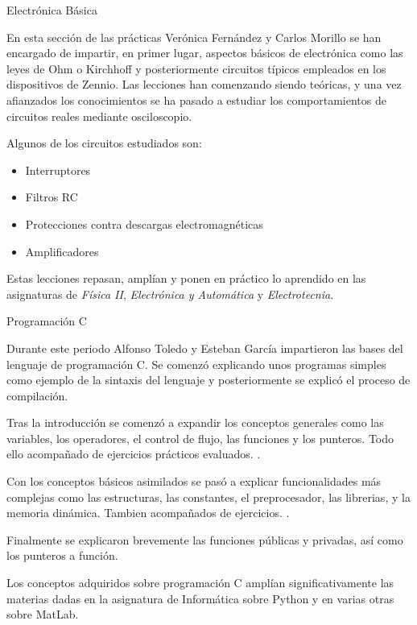 \ReportSection
{Electrónica Básica}{}
{
    En esta sección de las prácticas Verónica Fernández y Carlos Morillo se han encargado de impartir, en primer lugar, aspectos básicos de electrónica como las leyes de Ohm o Kirchhoff y posteriormente circuitos típicos empleados en los dispositivos de Zennio.
    Las lecciones han comenzando siendo teóricas, y una vez afianzados los conocimientos se ha pasado a estudiar los comportamientos de circuitos reales mediante osciloscopio.
    
    Algunos de los circuitos estudiados son:
    \begin{itemize}
        \item Interruptores
        \item Filtros RC
        \item Protecciones contra descargas electromagnéticas
        \item Amplificadores
    \end{itemize}
}
{
    Estas lecciones repasan, amplían y ponen en práctico lo aprendido en las asignaturas de \emph{Física II}, \emph{Electrónica y Automática} y \emph{Electrotecnia}.
}

\ReportSection
{Programación C}{}
{
    Durante este periodo Alfonso Toledo y Esteban García impartieron las bases del lenguaje de programación C. Se comenzó explicando unos programas simples como ejemplo de la sintaxis del lenguaje y posteriormente se explicó el proceso de compilación.
    
    Tras la introducción se comenzó a expandir los conceptos generales como las variables, los operadores, el control de flujo, las funciones y los punteros. Todo ello acompañado de ejercicios prácticos evaluados. .
    
    Con los conceptos básicos asimilados se pasó a explicar funcionalidades más complejas como las estructuras, las constantes, el preprocesador, las librerias, y la memoria dinámica. Tambien acompañados de ejercicios. .
    
    Finalmente se explicaron brevemente las funciones públicas y privadas, así como los punteros a función.
}
{
    Los conceptos adquiridos sobre programación C amplían significativamente las materias dadas en la asignatura de Informática sobre Python y en varias otras sobre MatLab.
}

